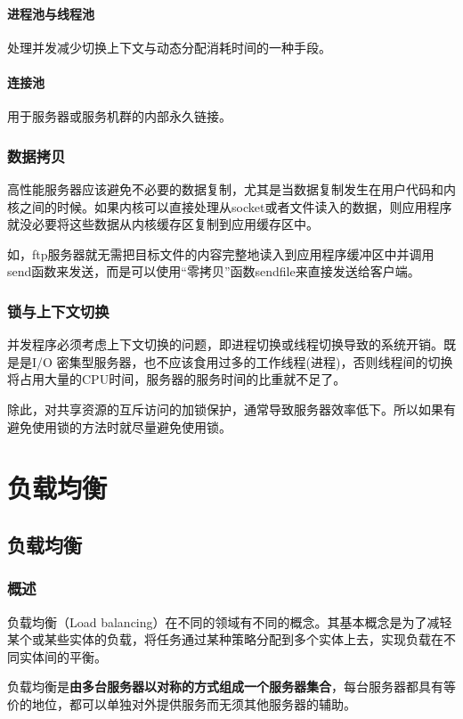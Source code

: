 \documentclass[UTF8,a4paper,12pt]{ctexbook}
\begin{document}
			\subsubsection{进程池与线程池}
				处理并发减少切换上下文与动态分配消耗时间的一种手段。
				
			\subsubsection{连接池}
				用于服务器或服务机群的内部永久链接。
				
		\subsection{数据拷贝}
			高性能服务器应该避免不必要的数据复制，尤其是当数据复制发生在用户代码和内核之间的时候。如果内核可以直接处理从socket或者文件读入的数据，则应用程序就没必要将这些数据从内核缓存区复制到应用缓存区中。
			
			如，ftp服务器就无需把目标文件的内容完整地读入到应用程序缓冲区中并调用send函数来发送，而是可以使用“零拷贝”函数sendfile来直接发送给客户端。
			
		\subsection{锁与上下文切换}
			并发程序必须考虑上下文切换的问题，即进程切换或线程切换导致的系统开销。既是是I/O 密集型服务器，也不应该食用过多的工作线程(进程)，否则线程间的切换将占用大量的CPU时间，服务器的服务时间的比重就不足了。
			
			除此，对共享资源的互斥访问的加锁保护，通常导致服务器效率低下。所以如果有避免使用锁的方法时就尽量避免使用锁。
		
		
\chapter{负载均衡}
	\section{负载均衡}
		\subsection{概述}
			负载均衡（Load balancing）在不同的领域有不同的概念。其基本概念是为了减轻某个或某些实体的负载，将任务通过某种策略分配到多个实体上去，实现负载在不同实体间的平衡。
			
			负载均衡是\textbf{由多台服务器以对称的方式组成一个服务器集合}，每台服务器都具有等价的地位，都可以单独对外提供服务而无须其他服务器的辅助。
			
\end{document}
